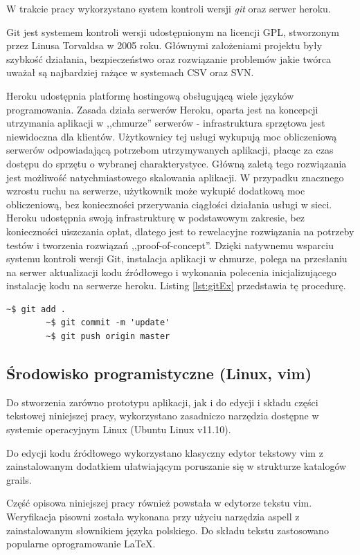  W trakcie pracy wykorzystano system kontroli wersji \emph{git} oraz serwer heroku. 

  Git jest systemem kontroli wersji udostępnionym na licencji GPL, stworzonym przez Linusa Torvaldsa w 2005 roku. Głównymi założeniami projektu były szybkość działania, bezpieczeństwo oraz rozwiązanie problemów jakie twórca uważał są najbardziej rażące w systemach CSV oraz SVN.

  Heroku udostępnia platformę hostingową obsługującą wiele języków programowania. Zasada działa serwerów Heroku, oparta jest na koncepcji utrzymania aplikacji w ,,chmurze'' serwerów - infrastruktura sprzętowa jest niewidoczna dla klientów. Użytkownicy tej usługi wykupują moc obliczeniową serwerów odpowiadającą potrzebom utrzymywanych aplikacji, płacąc za czas dostępu do sprzętu o wybranej charakterystyce. Główną zaletą tego rozwiązania jest możliwość natychmiastowego skalowania aplikacji. W przypadku znacznego wzrostu ruchu na serwerze, użytkownik może wykupić dodatkową moc obliczeniową, bez konieczności przerywania ciągłości działania usługi w sieci. Heroku udostępnia swoją infrastrukturę w podstawowym zakresie, bez konieczności uiszczania opłat, dlatego jest to rewelacyjne rozwiązania na potrzeby testów i tworzenia rozwiązań ,,proof-of-concept''. Dzięki natywnemu wsparciu systemu kontroli wersji Git, instalacja aplikacji w chmurze, polega na przesłaniu na serwer aktualizacji kodu źródłowego i wykonania polecenia inicjalizującego instalację kodu na serwerze heroku. Listing \ref{lst:gitEx} przedstawia tę procedurę.


        \begin{lstlisting}[caption={Commit i wysłanie kodu na serwer Heroku}, label={lst:gitEx}]
        ~$ git add .
        ~$ git commit -m 'update'
        ~$ git push origin master
        \end{lstlisting}

\subsection{Środowisko programistyczne (Linux, vim)}

  Do stworzenia zarówno prototypu aplikacji, jak i do edycji i składu części tekstowej niniejszej pracy, wykorzystano zasadniczo narzędzia dostępne w systemie operacyjnym Linux (Ubuntu Linux v11.10). 

  Do edycji kodu źródłowego wykorzystano klasyczny edytor tekstowy vim z zainstalowanym dodatkiem ułatwiającym poruszanie się w strukturze katalogów grails.

  Część opisowa niniejszej pracy również powstała w edytorze tekstu vim. Weryfikacja pisowni została wykonana przy użyciu narzędzia aspell z zainstalowanym słownikiem języka polskiego. Do składu tekstu zastosowano popularne oprogramowanie \LaTeX. 
